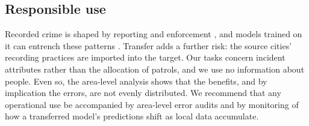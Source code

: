 \documentclass[11pt]{article}
\begin{document}
\subsection{Responsible use}
Recorded crime is shaped by reporting and enforcement \citep{akpinar2021}, and models trained on it can entrench these patterns \citep{ensign2018}. Transfer adds a further risk: the source cities' recording practices are imported into the target. Our tasks concern incident attributes rather than the allocation of patrols, and we use no information about people. Even so, the area-level analysis shows that the benefits, and by implication the errors, are not evenly distributed. We recommend that any operational use be accompanied by area-level error audits and by monitoring of how a transferred model's predictions shift as local data accumulate.
\end{document}
